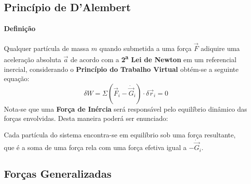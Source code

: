 \documentclass{article}
\begin{document}
        \subsection{Princípio de D'Alembert}
            \paragraph{Definição}Qualquer partícula de massa $m$ quando submetida a uma força $\vec{F}$ adiquire uma aceleração absoluta $\vec{a}$ de acordo com a \textbf{2\textsuperscript{a} Lei de Newton} em um referencial inercial, considerando o \textbf{Princípio do Trabalho Virtual} obtém-se a seguinte equação:
                \begin{equation}
                    \boxed{
                        \delta W = 
                        \Sigma
                        \left(
                            \vec{F}_{i} - \dot{\vec{G}}_{i}
                        \right) \cdot \delta\vec{r}_{i} = 0
                    }
                \end{equation}
            Nota-se que uma \textbf{Força de Inércia} será responsável pelo equilíbrio dinâmico das forças envolvidas. Desta maneira poderá ser enunciado:
                \begin{displayquote}[][]
                    Cada partícula do sistema encontra-se em equilíbrio sob uma força resultante, que é a soma de uma força rela com uma força efetiva igual a $-\dot{\vec{G}}_{i}$.
                \end{displayquote}

        \subsection{Forças Generalizadas}
\end{document}
